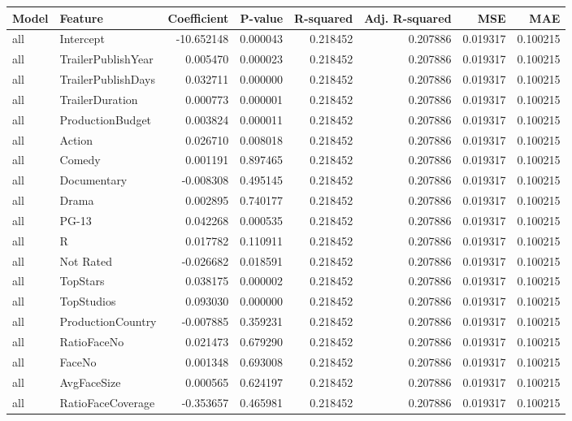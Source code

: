 \begin{tabular}{llrrrrrr}
\toprule
Model & Feature & Coefficient & P-value & R-squared & Adj. R-squared & MSE & MAE \\
\midrule
all & Intercept & -10.652148 & 0.000043 & 0.218452 & 0.207886 & 0.019317 & 0.100215 \\
all & TrailerPublishYear & 0.005470 & 0.000023 & 0.218452 & 0.207886 & 0.019317 & 0.100215 \\
all & TrailerPublishDays & 0.032711 & 0.000000 & 0.218452 & 0.207886 & 0.019317 & 0.100215 \\
all & TrailerDuration & 0.000773 & 0.000001 & 0.218452 & 0.207886 & 0.019317 & 0.100215 \\
all & ProductionBudget & 0.003824 & 0.000011 & 0.218452 & 0.207886 & 0.019317 & 0.100215 \\
all & Action & 0.026710 & 0.008018 & 0.218452 & 0.207886 & 0.019317 & 0.100215 \\
all & Comedy & 0.001191 & 0.897465 & 0.218452 & 0.207886 & 0.019317 & 0.100215 \\
all & Documentary & -0.008308 & 0.495145 & 0.218452 & 0.207886 & 0.019317 & 0.100215 \\
all & Drama & 0.002895 & 0.740177 & 0.218452 & 0.207886 & 0.019317 & 0.100215 \\
all & PG-13 & 0.042268 & 0.000535 & 0.218452 & 0.207886 & 0.019317 & 0.100215 \\
all & R & 0.017782 & 0.110911 & 0.218452 & 0.207886 & 0.019317 & 0.100215 \\
all & Not Rated & -0.026682 & 0.018591 & 0.218452 & 0.207886 & 0.019317 & 0.100215 \\
all & TopStars & 0.038175 & 0.000002 & 0.218452 & 0.207886 & 0.019317 & 0.100215 \\
all & TopStudios & 0.093030 & 0.000000 & 0.218452 & 0.207886 & 0.019317 & 0.100215 \\
all & ProductionCountry & -0.007885 & 0.359231 & 0.218452 & 0.207886 & 0.019317 & 0.100215 \\
all & RatioFaceNo & 0.021473 & 0.679290 & 0.218452 & 0.207886 & 0.019317 & 0.100215 \\
all & FaceNo & 0.001348 & 0.693008 & 0.218452 & 0.207886 & 0.019317 & 0.100215 \\
all & AvgFaceSize & 0.000565 & 0.624197 & 0.218452 & 0.207886 & 0.019317 & 0.100215 \\
all & RatioFaceCoverage & -0.353657 & 0.465981 & 0.218452 & 0.207886 & 0.019317 & 0.100215 \\

\end{tabular}
